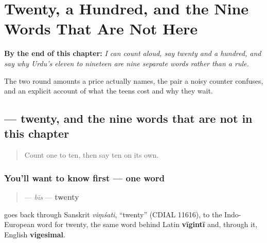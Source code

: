 
\chapter{Twenty, a Hundred, and the Nine Words That Are Not Here}
\label{ch:ur-round-amounts}

\begin{chapteropening}
\textbf{By the end of this chapter:} \emph{I can count aloud, say twenty and a hundred, and say why Urdu's eleven to nineteen are nine separate words rather than a rule.}

The two round amounts a price actually names, the pair a noisy counter confuses, and an explicit account of what the teens cost and why they wait.
\end{chapteropening}

\section[\texorpdfstring{\ur{بیس} (bīs)}{بیس (bīs)}]{ — twenty, and the nine words that are not in this chapter}

\label{lesson:UR-C30-bees}



\begin{quote}
Count one to ten, then say ten on its own.
\end{quote}

\subsection*{You'll want to know first — one word}
\begin{quote}
\textbf{} — \emph{bīs} — \textbf{twenty}
\end{quote}

\textbf{} goes back through Sanskrit \emph{viṃśati}, \textquotedblleft{}twenty\textquotedblright{} (CDIAL 11616), to the Indo-European word for twenty, the same word behind Latin \textbf{vīgintī} and, through it, English \textbf{vigesimal}.

